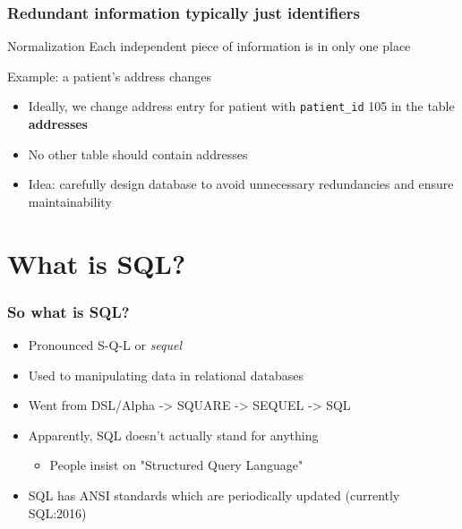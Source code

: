 \documentclass{beamer}
\begin{document}
\begin{frame}
\frametitle{Redundant information typically just identifiers}

\begin{block}{Normalization}
	Each independent piece of information is in only one place
\end{block}

Example: a patient's address changes
\begin{itemize}
	\item Ideally, we change address entry for patient with \texttt{patient\_id} 105 in the table \textbf{addresses}
	\item No other table should contain addresses
	\item Idea: carefully design database to avoid unnecessary redundancies and ensure maintainability
\end{itemize}

\end{frame}

\section{What is SQL?}

\begin{frame}
\frametitle{So what is SQL?}
\begin{itemize}
	\item Pronounced S-Q-L or \textit{sequel}
	\item Used to manipulating data in relational databases
	\item Went from DSL/Alpha -> SQUARE -> SEQUEL -> SQL
	\item Apparently, SQL doesn't actually stand for anything
	\begin{itemize}
		\item People insist on "Structured Query Language"
	\end{itemize}
	\item SQL has ANSI standards which are periodically updated (currently SQL:2016)
\end{itemize}
\end{frame}
\end{document}
